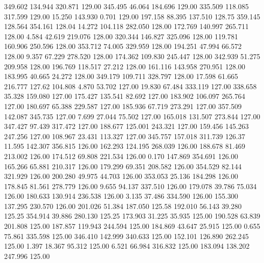  349.602  134.944  320.871       129.00
 345.495   46.064  184.696       129.00
 335.509  118.085  317.599       129.00
  15.250  143.930    0.701       129.00
 197.158   88.395  137.510       128.75
 359.145  128.564  354.161       128.04
  14.272  104.118  282.050       128.00
 172.769  140.997  265.711       128.00
   4.584   42.619  219.076       128.00
 320.344  146.827  325.096       128.00
 119.781  160.906  250.596       128.00
 353.712   74.005  329.959       128.00
 194.251   47.994   66.572       128.00
   9.357   67.229  278.520       128.00
 174.362  109.830  245.447       128.00
 342.939   51.275  209.958       128.00
 196.769  118.517   27.212       128.00
 161.116  143.958  270.951       128.00
 183.995   40.665   24.272       128.00
 349.179  109.711  328.797       128.00
  17.598   61.665  216.777       127.62
 104.808    4.870   53.702       127.00
  19.830   67.484  333.119       127.00
 338.658   35.328  159.080       127.00
 175.427  135.541   82.692       127.00
 183.902  106.097  265.764       127.00
 180.697   65.388  229.587       127.00
 185.936   67.719  273.291       127.00
 357.509  142.087  345.735       127.00
   7.699   27.044   75.502       127.00
 165.018  131.507  273.844       127.00
 347.427   97.439  317.472       127.00
 188.677  125.001  243.321       127.00
 159.456  145.263  247.256       127.00
 108.967   23.431  113.327       127.00
 345.757  157.018  311.739       126.37
  11.595  142.307  356.815       126.00
 162.293  124.195  268.039       126.00
 188.678   81.469  213.002       126.00
 174.512   69.808  221.534       126.00
   0.170  147.869  354.691       126.00
 165.266   65.881  210.317       126.00
 179.299   69.351  208.582       126.00
 354.529   82.144  321.929       126.00
 200.280   49.975   44.703       126.00
 353.053   25.136  184.298       126.00
 178.845   81.561  278.779       126.00
   9.655   94.137  337.510       126.00
 179.078   39.786   75.034       126.00
 180.633  130.914  236.538       126.00
   3.135   37.486  334.590       126.00
 155.300  137.295  230.570       126.00
 201.026   51.384  187.050       125.58
 192.010   56.143   39.280       125.25
 354.914   39.886  280.130       125.25
 173.903   31.225   35.935       125.00
 190.528   63.839  201.808       125.00
 187.857  119.943  244.594       125.00
 184.869   43.647   25.915       125.00
   0.655   75.861  335.598       125.00
 346.410  142.999  340.633       125.00
 152.101  126.890  262.245       125.00
   1.397   18.367   95.312       125.00
   6.521   66.984  316.832       125.00
 183.094  138.202  247.996       125.00
